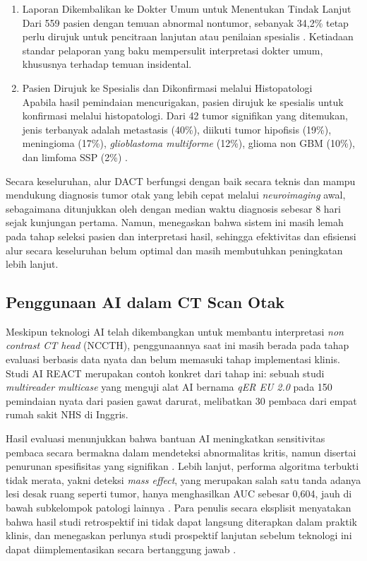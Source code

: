 \begin{enumerate}
	\item Laporan Dikembalikan ke Dokter Umum untuk Menentukan Tindak Lanjut\\
	Dari 559 pasien dengan temuan abnormal nontumor, sebanyak 34,2\% tetap perlu dirujuk untuk pencitraan lanjutan atau penilaian spesialis \cite{zienius2019direct}. Ketiadaan standar pelaporan yang baku mempersulit interpretasi dokter umum, khususnya terhadap temuan insidental.
	
	\item Pasien Dirujuk ke Spesialis dan Dikonfirmasi melalui Histopatologi\\
	Apabila hasil pemindaian mencurigakan, pasien dirujuk ke spesialis untuk konfirmasi melalui histopatologi. Dari 42 tumor signifikan yang ditemukan, jenis terbanyak adalah metastasis (40\%), diikuti tumor hipofisis (19\%), meningioma (17\%), \textit{glioblastoma multiforme} (12\%), glioma non GBM (10\%), dan limfoma SSP (2\%) \cite{zienius2019direct}.
\end{enumerate}

Secara keseluruhan, alur DACT berfungsi dengan baik secara teknis dan mampu mendukung diagnosis tumor otak yang lebih cepat melalui \textit{neuroimaging} awal, sebagaimana ditunjukkan oleh \textcite{carey2019impact} dengan median waktu diagnosis sebesar 8 hari sejak kunjungan pertama. Namun, \textcite{zienius2019direct} menegaskan bahwa sistem ini masih lemah pada tahap seleksi pasien dan interpretasi hasil, sehingga efektivitas dan efisiensi alur secara keseluruhan belum optimal dan masih membutuhkan peningkatan lebih lanjut.

\subsection{Penggunaan AI dalam CT Scan Otak}

Meskipun teknologi AI telah dikembangkan untuk membantu interpretasi \textit{non contrast CT head} (NCCTH), penggunaannya saat ini masih berada pada tahap evaluasi berbasis data nyata dan belum memasuki tahap implementasi klinis. Studi AI REACT \cite{fu2024ai} merupakan contoh konkret dari tahap ini: sebuah studi \textit{multireader multicase} yang menguji alat AI bernama \textit{qER EU 2.0} pada 150 pemindaian nyata dari pasien gawat darurat, melibatkan 30 pembaca dari empat rumah sakit NHS di Inggris.

Hasil evaluasi menunjukkan bahwa bantuan AI meningkatkan sensitivitas pembaca secara bermakna dalam mendeteksi abnormalitas kritis, namun disertai penurunan spesifisitas yang signifikan \cite{fu2024ai}. Lebih lanjut, performa algoritma terbukti tidak merata, yakni deteksi \textit{mass effect}, yang merupakan salah satu tanda adanya lesi desak ruang seperti tumor, hanya menghasilkan AUC sebesar 0,604, jauh di bawah subkelompok patologi lainnya \cite{fu2024ai}. Para penulis secara eksplisit menyatakan bahwa hasil studi retrospektif ini tidak dapat langsung diterapkan dalam praktik klinis, dan menegaskan perlunya studi prospektif lanjutan sebelum teknologi ini dapat diimplementasikan secara bertanggung jawab \cite{fu2024ai}.


